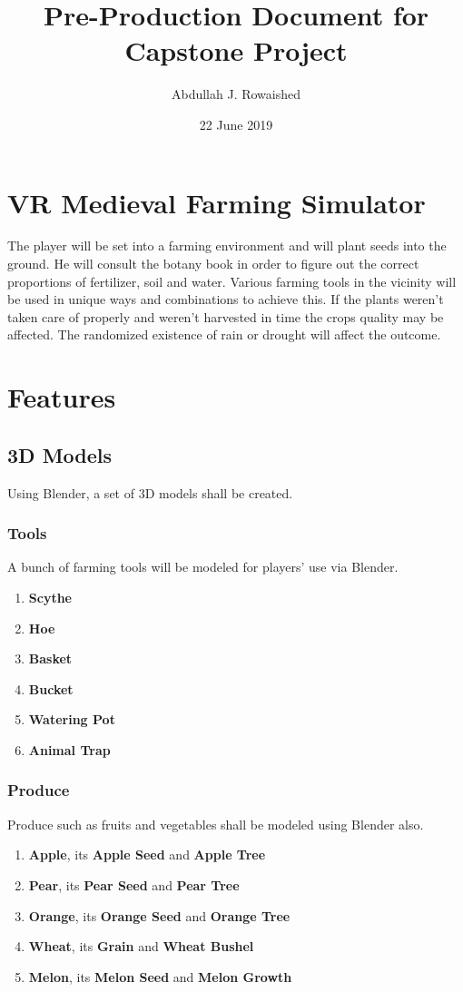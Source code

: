 \documentclass{article}
\title{Pre-Production Document for Capstone Project}
\author{Abdullah J. Rowaished}
\date{22 June 2019}
\begin{document}
\maketitle
\section{VR Medieval Farming Simulator}
The player will be set into a farming environment and will plant seeds into the ground. He will consult the botany book in order to figure out the correct proportions of fertilizer, soil and water. Various farming tools in the vicinity will be used in unique ways and combinations to achieve this. If the plants weren't taken care of properly and weren't harvested in time the crops quality may be affected. The randomized existence of rain or drought will affect the outcome.
\section{Features}
\subsection{3D Models}
Using Blender, a set of 3D models shall be created.
\subsubsection{Tools}
A bunch of farming tools will be modeled for players' use via Blender.
\begin{enumerate}
\item \textbf{Scythe}
\item \textbf{Hoe}
\item \textbf{Basket}
\item \textbf{Bucket}
\item \textbf{Watering Pot}
\item \textbf{Animal Trap}
\end{enumerate}
\subsubsection{Produce}
Produce such as fruits and vegetables shall be modeled using Blender also.
\begin{enumerate}
\item \textbf{Apple}, its \textbf{Apple Seed} and \textbf{Apple Tree}
\item \textbf{Pear}, its \textbf{Pear Seed} and \textbf{Pear Tree}
\item \textbf{Orange}, its \textbf{Orange Seed} and \textbf{Orange Tree}
\item \textbf{Wheat}, its \textbf{Grain} and \textbf{Wheat Bushel}
\item \textbf{Melon}, its \textbf{Melon Seed} and \textbf{Melon Growth}
\end{enumerate}
\end{document}
